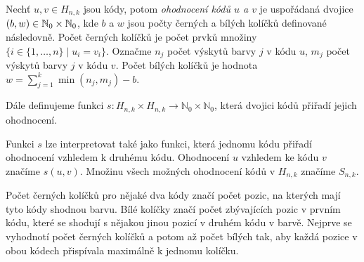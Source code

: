 \begin{definice}[Ohodnocení]\label{ohodnoceni}
  Nechť $u,v \in H_{n,k}$ jsou kódy, potom \emph{ohodnocení kódů $u$ a $v$} je uspořádaná dvojice $(b,w) \in \mathbb{N}_0 \times \mathbb{N}_0$, kde $b$ a $w$ jsou počty černých a bílých kolíčků definované následovně. Počet černých kolíčků je počet prvků množiny $\{i \in \{1,\dots, n\}\mid  u_i = v_i \}$. Označme $n_j$ počet výskytů barvy $j$ v kódu $u$, $m_j$ počet výskytů barvy $j$ v kódu $v$. Počet bílých kolíčků je hodnota $w = \sum_{j = 1}^k \min(n_j, m_j)-b$.

  Dále definujeme funkci $s \colon H_{n,k} \times H_{n,k} \to \mathbb{N}_0\times \mathbb{N}_0$, která dvojici kódů přiřadí jejich ohodnocení.
\end{definice}
\begin{pozn}
    Funkci $s$ lze interpretovat také jako funkci, která jednomu kódu přiřadí ohodnocení vzhledem k druhému kódu. Ohodnocení $u$ vzhledem ke kódu $v$ značíme $s(u,v)$. Množinu všech možných ohodnocení kódů v $H_{n,k}$ značíme $S_{n,k}$.
\end{pozn}

Počet černých kolíčků pro nějaké dva kódy značí počet pozic, na kterých mají tyto kódy shodnou barvu. Bílé kolíčky značí počet zbývajících pozic v prvním kódu, které se shodují s nějakou jinou pozicí v druhém kódu v barvě. Nejprve se vyhodnotí počet černých kolíčků a potom až počet bílých tak, aby každá pozice v obou kódech přispívala maximálně k jednomu kolíčku. 





